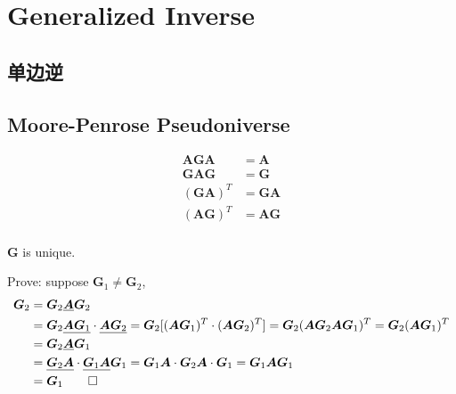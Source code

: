 \documentclass[UTF8]{../../09-Mathematics}
\begin{document}
\chapter{Generalized Inverse}


\section{单边逆}

\section{Moore-Penrose Pseudoniverse}

$$
\begin{aligned}
    \boldsymbol A \boldsymbol G \boldsymbol A &= \boldsymbol A\\
    \boldsymbol G \boldsymbol A \boldsymbol G &= \boldsymbol G\\
    (\boldsymbol G \boldsymbol A )^T &= \boldsymbol G \boldsymbol A\\
    (\boldsymbol A \boldsymbol G )^T &= \boldsymbol A \boldsymbol G\\
\end{aligned}
$$


\begin{lemma}
    $\boldsymbol G$ is unique.
    
    Prove: suppose $\boldsymbol G_1 \neq \boldsymbol G_2$,
    $$
    \begin{aligned}
        \boldsymbol G_2 &= \boldsymbol G_2 \underline{\boldsymbol A}  \boldsymbol G_2\\
        &= \boldsymbol G_2 \underline{\boldsymbol A \boldsymbol G_1} \cdot \underline{\boldsymbol A \boldsymbol G_2} = \boldsymbol G_2 [(\boldsymbol A \boldsymbol G_1)^T \cdot (\boldsymbol A \boldsymbol G_2)^T] = \boldsymbol G_2(\boldsymbol A \boldsymbol G_2\boldsymbol A \boldsymbol G_1)^T= \boldsymbol G_2(\boldsymbol A  \boldsymbol G_1)^T\\
        &= \boldsymbol G_2 \underline{\boldsymbol A}  \boldsymbol G_1\\
        &=\underline{\boldsymbol G_2 \boldsymbol A} \cdot \underline{\boldsymbol G_1 \boldsymbol A } \boldsymbol G_1 =\boldsymbol G_1 \boldsymbol A \cdot \boldsymbol G_2 \boldsymbol A  \cdot \boldsymbol G_1=\boldsymbol G_1 \boldsymbol A \boldsymbol G_1\\
        &= \boldsymbol G_1 \qed
    \end{aligned}
    $$

\end{lemma}
\end{document}
